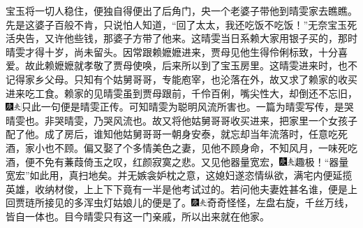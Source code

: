 宝玉将一切人稳住，便独自得便出了后角门，央一个老婆子带他到晴雯家去瞧瞧。先是这婆子百般不肯，只说怕人知道，“回了太太，我还吃饭不吃饭！”无奈宝玉死活央告，又许他些钱，那婆子方带了他来。这晴雯当日系赖大家用银子买的，那时晴雯才得十岁，尚未留头。因常跟赖嬷嬷进来，贾母见他生得伶俐标致，十分喜爱。故此赖嬷嬷就孝敬了贾母使唤，后来所以到了宝玉房里。这晴雯进来时，也不记得家乡父母。只知有个姑舅哥哥，专能庖宰，也沦落在外，故又求了赖家的收买进来吃工食。赖家的见晴雯虽到贾母跟前，千伶百俐，嘴尖性大，却倒还不忘旧，{\includegraphics[width=3mm]{../Images/00004}\includegraphics[width=3mm]{../Images/00012}\footnotesize \kaishu 只此一句便是晴雯正传。可知晴雯为聪明风流所害也。一篇为晴雯写传，是哭晴雯也。非哭晴雯，乃哭风流也。}故又将他姑舅哥哥收买进来，把家里一个女孩子配了他。成了房后，谁知他姑舅哥哥一朝身安泰，就忘却当年流落时，任意吃死酒，家小也不顾。偏又娶了个多情美色之妻，见他不顾身命，不知风月，一味死吃酒，便不免有蒹葭倚玉之叹，红颜寂寞之悲。又见他器量宽宏，{\includegraphics[width=3mm]{../Images/00004}\includegraphics[width=3mm]{../Images/00012}\footnotesize \kaishu 趣极！“器量宽宏”如此用，真扫地矣。}并无嫉衾妒枕之意，这媳妇遂恣情纵欲，满宅内便延揽英雄，收纳材俊，上上下下竟有一半是他考试过的。若问他夫妻姓甚名谁，便是上回贾琏所接见的多浑虫灯姑娘儿的便是了。{\includegraphics[width=3mm]{../Images/00004}\includegraphics[width=3mm]{../Images/00012}\footnotesize \kaishu 奇奇怪怪，左盘右旋，千丝万线，皆自一体也。}目今晴雯只有这一门亲戚，所以出来就在他家。


